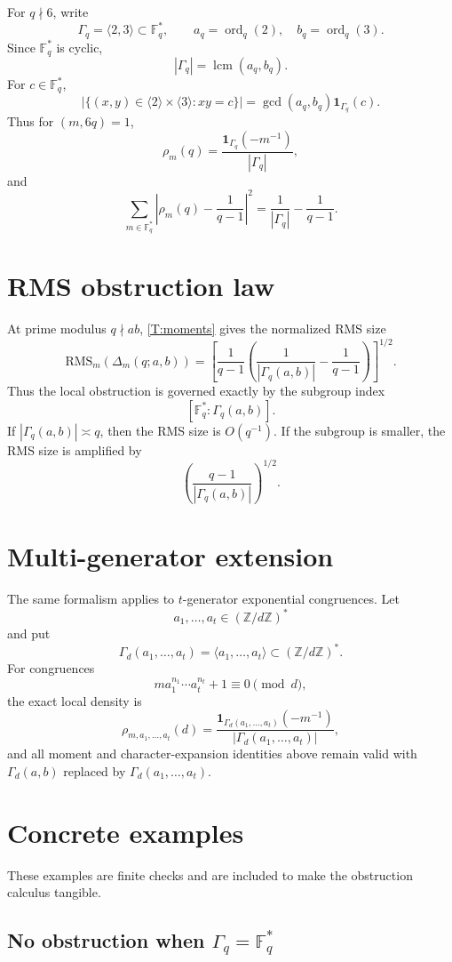 \documentclass[11pt]{article}
\newcommand{\Z}{\mathbb Z}
\newcommand{\F}{\mathbb F}
\newcommand{\1}{\mathbf 1}
\newcommand{\ord}{\operatorname{ord}}
\newcommand{\lcm}{\operatorname{lcm}}
\begin{document}
For \(q\nmid6\), write
\[
\Gamma_q=\langle2,3\rangle\subset\F_q^*,
\qquad
a_q=\ord_q(2),\quad b_q=\ord_q(3).
\]
Since \(\F_q^*\) is cyclic,
\[
|\Gamma_q|=\lcm(a_q,b_q).
\]
For \(c\in\F_q^*\),
\[
|\{(x,y)\in\langle2\rangle\times\langle3\rangle:xy=c\}|
=
\gcd(a_q,b_q)\1_{\Gamma_q}(c).
\]
Thus for \((m,6q)=1\),
\[
\rho_m(q)=\frac{\1_{\Gamma_q}(-m^{-1})}{|\Gamma_q|},
\]
and
\[
\sum_{m\in\F_q^*}\left|
\rho_m(q)-\frac1{q-1}
\right|^2
=
\frac1{|\Gamma_q|}-\frac1{q-1}.
\]

\section{RMS obstruction law}

At prime modulus \(q\nmid ab\), \cref{T:moments} gives the normalized RMS size
\[
\mathrm{RMS}_m(\Delta_m(q;a,b))
=
\left[
\frac1{q-1}\left(
\frac1{|\Gamma_q(a,b)|}-\frac1{q-1}
\right)
\right]^{1/2}.
\]
Thus the local obstruction is governed exactly by the subgroup index
\[
[\F_q^*:\Gamma_q(a,b)].
\]
If \(|\Gamma_q(a,b)|\asymp q\), then the RMS size is \(O(q^{-1})\).  If the subgroup is smaller, the RMS size is amplified by
\[
\left(\frac{q-1}{|\Gamma_q(a,b)|}\right)^{1/2}.
\]

\section{Multi-generator extension}

The same formalism applies to \(t\)-generator exponential congruences.  Let
\[
a_1,\dots,a_t\in(\Z/d\Z)^*
\]
and put
\[
\Gamma_d(a_1,\dots,a_t)=\langle a_1,\dots,a_t\rangle\subset(\Z/d\Z)^*.
\]
For congruences
\[
m a_1^{n_1}\cdots a_t^{n_t}+1\equiv0\pmod d,
\]
the exact local density is
\[
\rho_{m,a_1,\dots,a_t}(d)
=
\frac{\1_{\Gamma_d(a_1,\dots,a_t)}(-m^{-1})}{|\Gamma_d(a_1,\dots,a_t)|},
\]
and all moment and character-expansion identities above remain valid with \(\Gamma_d(a,b)\) replaced by \(\Gamma_d(a_1,\dots,a_t)\).

\section{Concrete examples}

These examples are finite checks and are included to make the obstruction calculus tangible.

\subsection{No obstruction when \texorpdfstring{\(\Gamma_q=\F_q^*\)}{Gamma\_q = F\_q\^{}*}}
\end{document}
